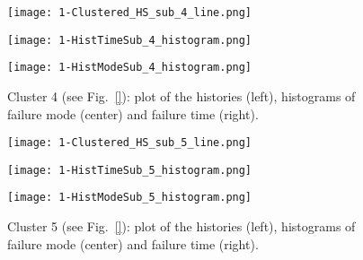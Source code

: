 \begin{figure}
  \centering
  \begin{minipage}{.33\textwidth}
  \centering
  \texttt{[image: 1-Clustered\_HS\_sub\_4\_line.png]}
  \end{minipage}\hfill
  \begin{minipage}{.33\textwidth}
  \centering
  \texttt{[image: 1-HistTimeSub\_4\_histogram.png]}
  \end{minipage}\hfill
  \begin{minipage}{.33\textwidth}
  \centering
  \texttt{[image: 1-HistModeSub\_4\_histogram.png]}
  \end{minipage}
  \caption{Cluster 4 (see Fig.~\ref{}): plot of the histories (left), histograms of failure mode 
           (center) and failure time (right).}
  \label{fig:pump_cluster_1_4}
\end{figure}


\begin{figure}
  \centering
  \begin{minipage}{.33\textwidth}
  \centering
  \texttt{[image: 1-Clustered\_HS\_sub\_5\_line.png]}
  \end{minipage}\hfill
  \begin{minipage}{.33\textwidth}
  \centering
  \texttt{[image: 1-HistTimeSub\_5\_histogram.png]}
  \end{minipage}\hfill
  \begin{minipage}{.33\textwidth}
  \centering
  \texttt{[image: 1-HistModeSub\_5\_histogram.png]}
  \end{minipage}
  \caption{Cluster 5 (see Fig.~\ref{}): plot of the histories (left), histograms of failure mode 
           (center) and failure time (right).}
  \label{fig:pump_cluster_1_5}
\end{figure}

